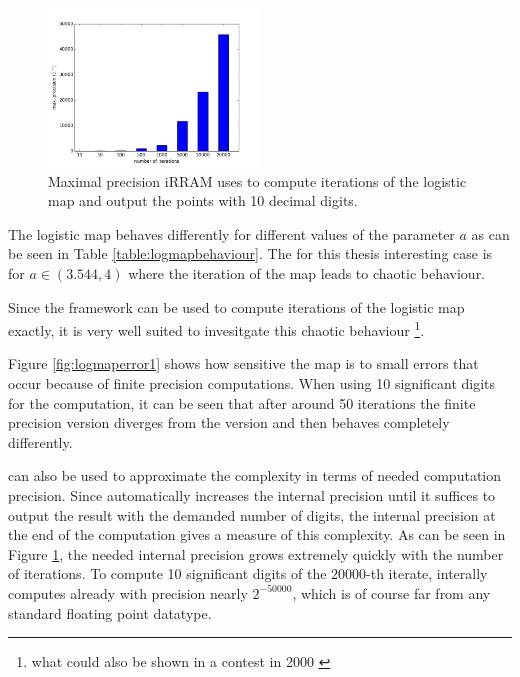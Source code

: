     \begin{figure}[H]
    \centering
    \includegraphics[width=0.5\textwidth]{img/dynamic_systems/logmap2}
    \caption{Maximal precision iRRAM uses to compute iterations of the logistic map and output the points with 10 decimal digits.}
    \label{fig:logmapprec}
  \end{figure}
  The logistic map behaves differently for different values of the parameter $a$ as can be seen in Table \ref{table:logmapbehaviour}. 
  The for this thesis interesting case is for $a \in (3.544, 4)$ where the iteration of the map leads to chaotic behaviour.

  Since the \irram framework can be used to compute iterations of the logistic map exactly, it is very well suited to invesitgate this chaotic behaviour \footnote{what could also be shown in a contest in 2000 \cite{competition:2001}}. 

  Figure \ref{fig:logmaperror1} shows how sensitive the map is to small errors that occur because of finite precision computations. 
  When using 10 significant digits for the computation, it can be seen that after around 50 iterations the finite precision version diverges from the \irram version and then behaves completely differently. 

  \irram can also be used to approximate the complexity in terms of needed computation precision. Since \irram automatically increases the internal precision until it suffices to output the result with the demanded number of digits, the internal precision at the end of the computation gives a measure of this complexity. As can be seen in Figure \ref{fig:logmapprec}, the needed internal precision grows extremely quickly with the number of iterations.
  To compute 10 significant digits of the $20000$-th iterate, \irram interally computes already with precision nearly $2^{-50000}$, which is of course far from any standard floating point datatype.   
